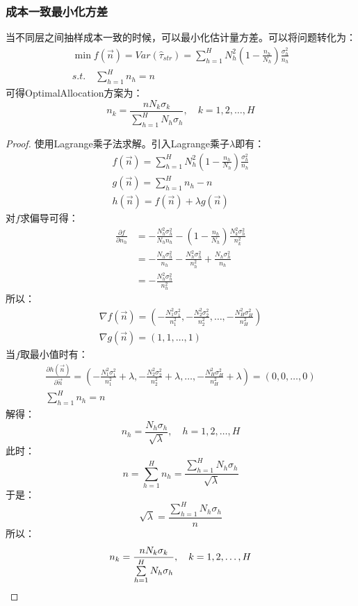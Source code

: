 \subsubsection{成本一致最小化方差}
当不同层之间抽样成本一致的时候，可以最小化估计量方差。可以将问题转化为：
\begin{gather*}
	\min f(\overrightarrow{n})=Var(\hat{\tau}_{str})=\sum_{h=1}^HN_h^2\left(1-\frac{n_h}{N_h}\right)\frac{\sigma_h^2}{n_h} \\
	s.t.\quad\sum_{h=1}^Hn_h=n
\end{gather*}
可得\gls{OptimalAllocation}方案为：
\begin{equation*}
	n_k=\frac{nN_k\sigma_k}{\sum\limits_{h=1}^HN_h\sigma_h},\quad k=1,2,\dots,H
\end{equation*}
\begin{proof}
	使用Lagrange乘子法求解。引入Lagrange乘子$\lambda$即有：
	\begin{gather*}
		f(\overrightarrow{n})=\sum_{h=1}^HN_h^2\left(1-\frac{n_h}{N_h}\right)\frac{\sigma_h^2}{n_h} \\
		g(\overrightarrow{n})=\sum_{h=1}^Hn_h-n \\
		h(\overrightarrow{n})=f(\overrightarrow{n})+\lambda g(\overrightarrow{n})
	\end{gather*}
	对$f$求偏导可得：
	\begin{align*}
		\frac{\partial f}{\partial n_h}&
		=-\frac{N_h^2\sigma_h^2}{N_hn_h}-\left(1-\frac{n_h}{N_h}\right)\frac{N_k^2\sigma_h^2}{n_k^2} \\
		&=-\frac{N_h\sigma_h^2}{n_h}-\frac{N_h^2\sigma_h^2}{n_h^2}+\frac{N_h\sigma_h^2}{n_h} \\
		&=-\frac{N_h^2\sigma_h^2}{n_h^2}
	\end{align*}
	所以：
	\begin{gather*}
		\nabla f(\overrightarrow{n})=(-\frac{N_1^2\sigma_1^2}{n_1^2},-\frac{N_2^2\sigma_2^2}{n_2^2},\dots,-\frac{N_H^2\sigma_H^2}{n_H^2}) \\
		\nabla g(\overrightarrow{n})=(1,1,\dots,1)
	\end{gather*}
	当$f$取最小值时有：
	\begin{gather*}
		\frac{\partial h(\overrightarrow{n})}{\partial \overrightarrow{n}}=(-\frac{N_1^2\sigma_1^2}{n_1^2}+\lambda,-\frac{N_2^2\sigma_2^2}{n_2^2}+\lambda,\dots,-\frac{N_H^2\sigma_H^2}{n_H^2}+\lambda)=(0,0,\dots,0) \\
		\sum_{h=1}^Hn_h=n
	\end{gather*}
	解得：
	\begin{equation*}
		n_h=\frac{N_h\sigma_h}{\sqrt{\lambda}},\quad h=1,2,\dots,H
	\end{equation*}
	此时：
	\begin{equation*}
		n=\sum_{h=1}^Hn_h=\frac{\sum\limits_{h=1}^HN_h\sigma_h}{\sqrt{\lambda}}
	\end{equation*}
	于是：
	\begin{equation*}
		\sqrt{\lambda}=\frac{\sum\limits_{h=1}^HN_h\sigma_h}{n}
	\end{equation*}
	所以：
	\begin{equation*}
		n_k=\frac{nN_k\sigma_k}{\sum\limits_{h=1}^HN_h\sigma_h},\quad k=1,2,\dots,H\qedhere
	\end{equation*}
\end{proof}
